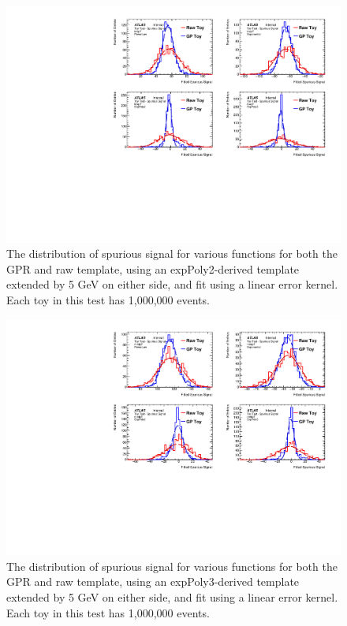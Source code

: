 \begin{figure} 
\begin{center}
  \includegraphics[width=\textwidth]{figures/background/gpr/validation/linear/ToyTest_FitSigVals_lowpT_1M_noSig}   
\caption{The distribution of spurious signal for various functions for both the GPR and raw template, using an expPoly2-derived template extended by 5 GeV on either side, and fit using a linear error kernel. Each toy in this test has 1,000,000 events.}
\label{fig:linearkernel_lowpt_1M_noSig}
\end{center}
\end{figure}

\begin{figure} 
\begin{center}
  \includegraphics[width=\textwidth]{figures/background/gpr/validation/linear/ToyTest_FitSigVals_medpT_1M_noSig}   
\caption{The distribution of spurious signal for various functions for both the GPR and raw template, using an expPoly3-derived template extended by 5 GeV on either side, and fit using a linear error kernel. Each toy in this test has 1,000,000 events.}
\label{fig:linearkernel_medpt_1M_noSig}
\end{center}
\end{figure}

